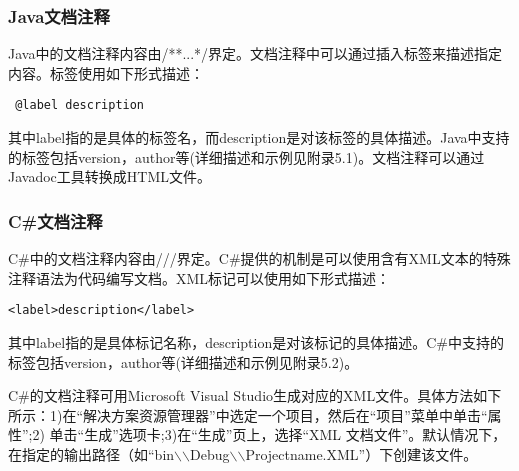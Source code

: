 \subsubsection{Java文档注释}

Java中的文档注释内容由/**...*/界定。文档注释中可以通过插入标签来描述指定内容。标签使用如下形式描述：
\begin{lstlisting}
 @label description
\end{lstlisting}

其中label指的是具体的标签名，而description是对该标签的具体描述。Java中支持的标签包括version，author等(详细描述和示例见附录5.1)。文档注释可以通过Javadoc工具转换成HTML文件。

\subsubsection{C\#文档注释}

C\#中的文档注释内容由///界定。C\#提供的机制是可以使用含有XML文本的特殊注释语法为代码编写文档。XML标记可以使用如下形式描述：
\begin{lstlisting}
<label>description</label>
\end{lstlisting}

其中label指的是具体标记名称，description是对该标记的具体描述。C\#中支持的标签包括version，author等(详细描述和示例见附录5.2)。

C\#的文档注释可用Microsoft Visual Studio生成对应的XML文件。具体方法如下所示：1)在“解决方案资源管理器”中选定一个项目，然后在“项目”菜单中单击“属性”;2) 单击“生成”选项卡;3)在“生成”页上，选择“XML 文档文件”。默认情况下，在指定的输出路径（如“bin$\backslash$$\backslash$Debug$\backslash$$\backslash$Projectname.XML”）下创建该文件。












